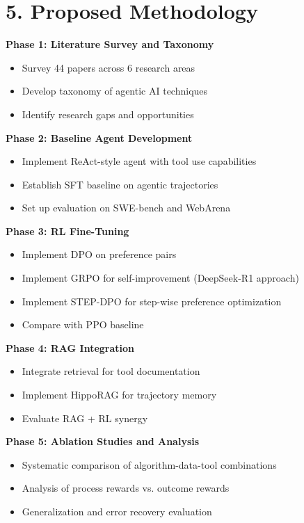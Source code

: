 \documentclass[12pt,a4paper]{report}
\theoremstyle{definition}
\begin{document}
\section*{5. Proposed Methodology}

\textbf{Phase 1: Literature Survey and Taxonomy}
\begin{itemize}
    \item Survey 44 papers across 6 research areas
    \item Develop taxonomy of agentic AI techniques
    \item Identify research gaps and opportunities
\end{itemize}

\textbf{Phase 2: Baseline Agent Development}
\begin{itemize}
    \item Implement ReAct-style agent with tool use capabilities
    \item Establish SFT baseline on agentic trajectories
    \item Set up evaluation on SWE-bench and WebArena
\end{itemize}

\textbf{Phase 3: RL Fine-Tuning}
\begin{itemize}
    \item Implement DPO on preference pairs
    \item Implement GRPO for self-improvement (DeepSeek-R1 approach)
    \item Implement STEP-DPO for step-wise preference optimization
    \item Compare with PPO baseline
\end{itemize}

\textbf{Phase 4: RAG Integration}
\begin{itemize}
    \item Integrate retrieval for tool documentation
    \item Implement HippoRAG for trajectory memory
    \item Evaluate RAG + RL synergy
\end{itemize}

\textbf{Phase 5: Ablation Studies and Analysis}
\begin{itemize}
    \item Systematic comparison of algorithm-data-tool combinations
    \item Analysis of process rewards vs. outcome rewards
    \item Generalization and error recovery evaluation
\end{itemize}
\end{document}
